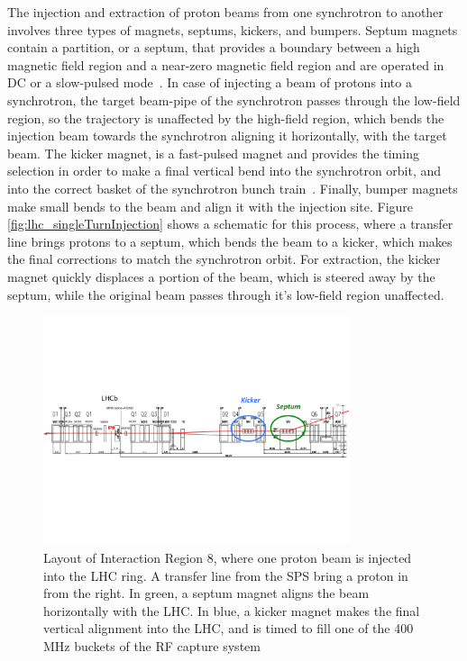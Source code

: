 \par The injection and extraction of proton beams from one synchrotron
to another involves three types of magnets, septums, kickers, and
bumpers.  Septum magnets contain a partition, or a septum, that
provides a boundary between a high magnetic field region and a
near-zero magnetic field region and are operated in DC or a
slow-pulsed mode~\cite{LHC:LHC_septums_Barnes}.  In case of injecting
a beam of protons into a synchrotron, the target beam-pipe of the synchrotron
passes through the low-field region, so the trajectory is unaffected
by the high-field region, which bends the injection beam towards the
synchrotron aligning it horizontally, with the target beam.  The
kicker magnet, is a fast-pulsed magnet and provides the timing
selection in order to make a final vertical bend into the
synchrotron orbit, and into the correct basket of the synchrotron bunch 
train~\cite{LHC:LHC_kickers_Barnes}.  Finally, bumper magnets make
small bends to the beam and align it with the injection site.  Figure
\ref{fig:lhc_singleTurnInjection} shows a schematic for this process,
where a transfer line brings protons to a septum, which bends the beam
to a kicker, which makes the final corrections to match the
synchrotron orbit.  For extraction, the kicker magnet quickly
displaces a portion of the beam, which is steered away by the septum,
while the original beam passes through it's low-field region 
unaffected.   

\begin{figure}[h]
   \centering
  \includegraphics[width=0.8\textwidth]{Figures/LHC_Diagrams/LHC_IR8-layout.pdf}
  \caption{Layout of Interaction Region 8, where one proton beam is
    injected into the LHC ring.  A transfer line from the SPS bring a
    proton in from the right.  In green, a septum magnet aligns the
    beam horizontally with the LHC.  In blue, a kicker magnet makes
    the final vertical alignment into the LHC, and is timed to fill
    one of the 400 MHz buckets of the RF capture
    system \cite{lhc:machine_description}} \label{fig:lhc_IR8_layout}
\end{figure}


